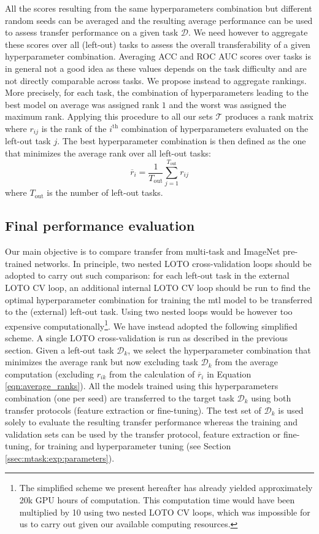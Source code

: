 All the scores resulting from the same hyperparameters combination but different random seeds can be averaged and the resulting average performance can be used to assess transfer performance on a given task $\mathcal{D}$. We need however to aggregate these scores over all (left-out) tasks to assess the overall transferability of a given hyperparameter combination. Averaging ACC and ROC AUC scores over tasks is in general not a good idea as these values depends on the task difficulty and are not directly comparable across tasks. We propose instead to aggregate rankings. More precisely, for each task, the combination of hyperparameters leading to the best model on average was assigned rank $1$ and the worst was assigned the maximum rank. Applying this procedure to all our sets $\mathcal{T}$ produces a rank matrix where $r_{ij}$ is the rank of the $i^{\text{th}}$ combination of hyperparameters evaluated on the left-out task $j$. The best hyperparameter combination is then defined as the one that minimizes the average rank over all left-out tasks:
\begin{equation} \label{eqn:average_ranks}
\overline{r}_i = \dfrac{1}{T_{\text{out}}} \sum^{T_{\text{out}}}_{j = 1} r_{ij}
\end{equation}
where $T_{\text{out}}$ is the number of left-out tasks.

\subsection{Final performance evaluation}
\label{ssec:mtask:exp:model_eval}

Our main objective is to compare transfer from multi-task and ImageNet pre-trained networks. In principle, two nested LOTO cross-validation loops should be adopted to carry out such comparison:  for each left-out task in the external LOTO CV loop, an additional internal LOTO CV loop should be run to find the optimal hyperparameter combination for training the \acrshort{mtl} model to be transferred to the (external) left-out task. Using two nested loops would be however too expensive computationally\footnote{The simplified scheme we present hereafter has already yielded approximately 20k GPU hours of computation. This computation time would have been multiplied by 10 using two nested LOTO CV loops, which was impossible for us to carry out given our available computing resources.}. We have instead adopted the following simplified scheme. A single LOTO cross-validation is run as described in the previous section. Given a left-out task $\mathcal{D}_k$, we select the hyperparameter combination that minimizes the average rank but now excluding task $\mathcal{D}_k$ from the average computation (\ie excluding $r_{ik}$ from the calculation of $\overline{r}_i$ in Equation \ref{eqn:average_ranks}). All the models trained using this hyperparameters combination (\ie one per seed) are transferred to the target task $\mathcal{D}_k$ using both transfer protocols (\ie feature extraction or fine-tuning). The test set of $\mathcal{D}_k$ is used solely to evaluate the resulting transfer performance whereas the training and validation sets can be used by the transfer protocol, feature extraction or fine-tuning, for training and hyperparameter tuning (see Section \ref{ssec:mtask:exp:parameters}).

